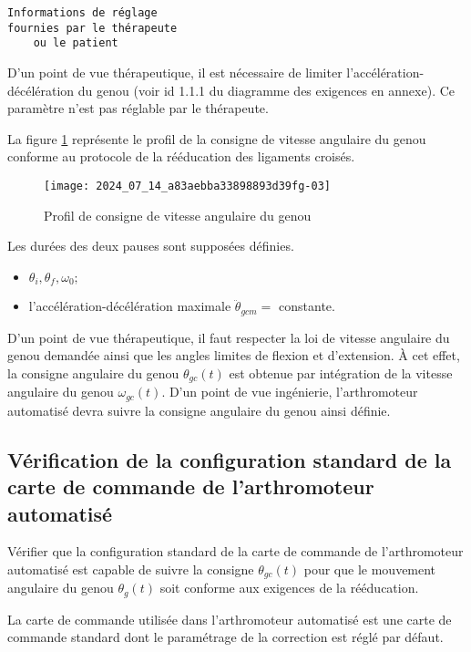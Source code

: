 \begin{verbatim}
Informations de réglage
fournies par le thérapeute
    ou le patient
\end{verbatim}


D'un point de vue thérapeutique, il est nécessaire de limiter l'accélération-décélération du genou (voir id 1.1.1 du diagramme des exigences en annexe). Ce paramètre n'est pas réglable par le thérapeute.

La figure \ref{fig:ccs_mp_2024:fig:05} représente le profil de la consigne de vitesse angulaire du genou conforme au protocole de la rééducation des ligaments croisés.

\begin{figure}[!h]
\centering
\texttt{[image: 2024\_07\_14\_a83aebba33898893d39fg-03]}
\caption{\label{fig:ccs_mp_2024:fig:05}Profil de consigne de vitesse angulaire du genou}
\end{figure}
Les durées des deux pauses sont supposées définies.

\begin{itemize}
\item $\theta_{i}, \theta_{f}, \omega_{0} ;$
  \item l'accélération-décélération maximale $\ddot{\theta}_{g c m}=$ constante.
\end{itemize}
D'un point de vue thérapeutique, il faut respecter la loi de vitesse angulaire du genou demandée ainsi que les angles limites de flexion et d'extension. À cet effet, la consigne angulaire du genou $\theta_{g c}(t)$ est obtenue par intégration de la vitesse angulaire du genou $\omega_{g c}(t)$. D'un point de vue ingénierie, l'arthromoteur automatisé devra suivre la consigne angulaire du genou ainsi définie.

\subsection{Vérification de la configuration standard de la carte de commande de l'arthromoteur automatisé}
\begin{obj}
Vérifier que la configuration standard de la carte de commande de l'arthromoteur automatisé est capable de suivre la consigne $\theta_{g c}(t)$ pour que le mouvement angulaire du genou $\theta_{g}(t)$ soit conforme aux exigences de la rééducation.
\end{obj}
La carte de commande utilisée dans l'arthromoteur automatisé est une carte de commande standard dont le paramétrage de la correction est réglé par défaut.

